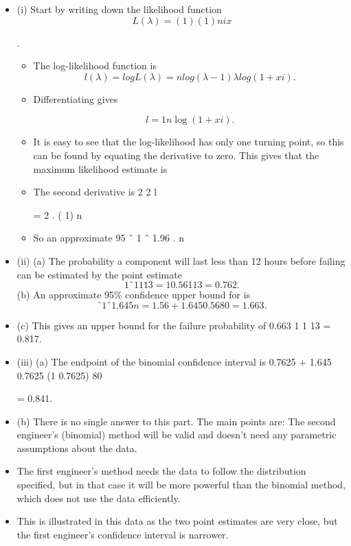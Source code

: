 \documentclass[a4paper,12pt]{article}
\begin{document}
\begin{itemize}
\item (i) Start by writing down the likelihood function
\[L(\lambda) =
( 1)
(1 )
n
i x\]

 
 
.
\begin{itemize}
    \item The log-likelihood function is
\[l(\lambda) = log L(\lambda) = n log(\lambda -1)  \lambda log(1 + xi).\]
\item Differentiating gives

\[l=1n \log(1 + xi).\]
\item It is easy to see that the log-likelihood has only one turning point, so this
can be found by equating the derivative to zero. This gives that the
maximum likelihood estimate is
\item The second derivative is
2
2
 l

= 2 .
( 1)
n
 
\item So an approximate 95%
ˆ 1
ˆ 1.96 .
n
 
\end{itemize}

 

\item (ii) (a) The probability a component will last less than 12 hours before
failing can be estimated by the point estimate
\[1  ˆ 1
1
13
= 1  0.56
1
13
= 0.762.\]
(b) An approximate 95\% confidence upper bound for  is
\[ ˆ 1 ˆ 1.645 n  = 1.56 + 1.645 0.56 80 = 1.663.\]
\item (c) This gives an upper bound for the failure probability of
0.663
1
1
13
 = 0.817.
\item (iii) (a) The endpoint of the binomial confidence interval is
0.7625 + 1.645 
0.7625 (1 0.7625)
80
 
= 0.841.
\item (b) There is no single answer to this part. The main points are:
The second engineer’s (binomial) method will be valid and doesn’t
need any parametric assumptions about the data.
\item The first engineer’s method needs the data to follow the
distribution specified, but in that case it will be more powerful
than the binomial method, which does not use the data efficiently.
\item This is illustrated in this data as the two point estimates are very
close, but the first engineer’s confidence interval is narrower.


\end{itemize}
\end{document}
